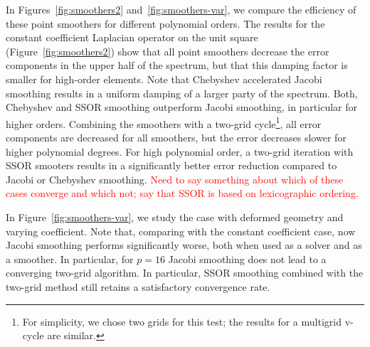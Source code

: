 \documentclass[smallcondensed,final]{svjour3}     %
\newcommand{\todo}[1]{\textcolor{red}{ #1}}
\begin{document}
In Figures~\ref{fig:smoothers2} and~\ref{fig:smoothers-var}, we
compare the efficiency of these point smoothers for different
polynomial orders. The results for the constant coefficient Laplacian
operator on the unit square (Figure~\ref{fig:smoothers2}) show that
all point smoothers decrease the error components in the upper half of
the spectrum, but that this damping factor is smaller for high-order
elements. Note that Chebyshev accelerated Jacobi smoothing results in
a uniform damping of a larger party of the spectrum. Both, Chebyshev
and SSOR smoothing outperform Jacobi smoothing, in particular for
higher orders. Combining the smoothers with a two-grid
cycle\footnote{For simplicity, we chose two grids for this test; the
  results for a multigrid v-cycle are similar.}, all error components
are decreased for all smoothers, but the error decreases slower for
higher polynomial degrees. For high polynomial order, a two-grid
iteration with SSOR smooters results in a significantly better error
reduction compared to Jacobi or Chebyshev smoothing. \todo{Need to say
  something about which of these cases converge and which not; say
  that SSOR is based on lexicographic ordering.}

In Figure~\ref{fig:smoothers-var}, we study the case with deformed
geometry and varying coefficient. Note that, comparing with the
constant coefficient case, now Jacobi smoothing performs significantly
worse, both when used as a solver and as a smoother. In particular,
for $p=16$ Jacobi smoothing does not lead to a converging two-grid
algorithm. In particular, SSOR smoothing combined with the two-grid
method still retains a satisfactory convergence rate.
\end{document}
